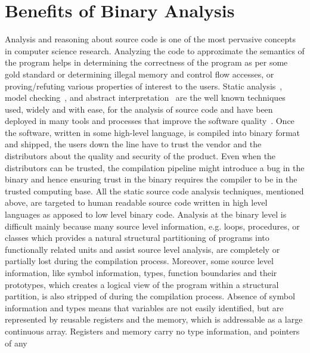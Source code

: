 \chapter{Benefits of Binary Analysis}\label{sec:ba}
Analysis and reasoning about source code is one of the most pervasive concepts
in computer science research. Analyzing the code to approximate  the semantics
of the program helps in determining the correctness of the program as per some
gold standard or determining illegal memory and control flow accesses, or
proving/refuting various properties of interest to the users. Static
analysis~\cite{Nielson2010}, model checking~\cite{Clarke1981,Queille1982}, and
abstract interpretation~\cite{Cousot1977} are the well known techniques used,
         widely and with ease, for the  analysis of source code and have been
         deployed in many tools and processes that improve the software
         quality~\cite{Xie:2003,Musuvathi:2008,Ivancic:2005,Dwyer:2007,Binkley:2007,Bessey2010,Ball2006}.
         Once the software, written in some high-level language, is compiled
         into binary format and shipped, the users down the line have to trust
         the vendor and the distributors about the quality and security of the
         product. Even when the distributors can be trusted, the compilation
         pipeline might introduce a bug in the binary and hence ensuring trust
         in the binary requires the compiler to be in the trusted computing
         base.  All the static source code analysis techniques, mentioned
         above, are targeted to human readable source code written in high
         level languages as apposed to low level binary code. Analysis at the
         binary level is difficult mainly because many source level
         information, e.g. loops, procedures, or classes which provides a
         natural structural partitioning of programs into functionally related
         units and assist source level analysis, are completely or partially
         lost during the compilation process. Moreover, some source level
         information, like symbol information, types, function boundaries and
         their prototypes, which creates a logical view of the program  within
         a structural partition, is also stripped of during the compilation
         process. Absence of symbol information and types means that variables
         are not easily identified, but are represented by reusable registers
         and the memory, which is addressable as a large continuous array.
         Registers and memory carry no type information, and pointers of any
